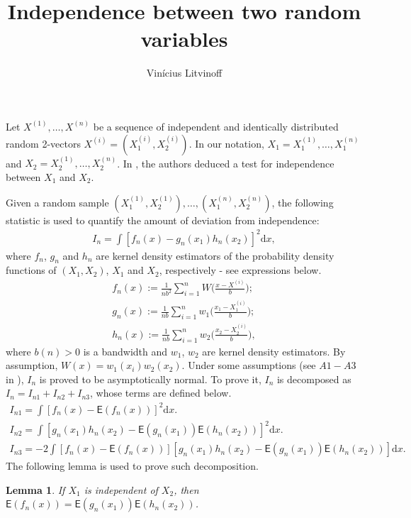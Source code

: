 \documentclass{article}
\title{Independence between two random variables}
\author{Vinícius Litvinoff}
\newtheorem{lemma}{Lemma}[section]
\begin{document}
\maketitle

Let $X^{(1)}, \dots, X^{(n)}$ be a sequence of independent and identically distributed random 2-vectors $X^{(i)} = (X_1^{(i)}, X_2^{(i)})$. In our notation, $X_1 = X_1^{(1)}, \dots, X_1^{(n)}$ and $X_2 = X_2^{(1)}, \dots, X_2^{(n)}$. In \cite{rosenblatt1992nonparametric}, the authors deduced a test for independence between $X_1$ and $X_2$.

Given a random sample $(X_1^{(1)},X_2^{(1)}), \dots, (X_1^{(n)},X_2^{(n)})$, the following statistic is used to quantify the amount of deviation from independence:
\begin{align}
    I_n = \int [f_n(x) - g_n(x_1) h_n(x_2)]^2 \mathrm{d} x,
\end{align}
where $f_n$, $g_n$ and $h_n$ are kernel density estimators of the probability density functions of $(X_1,X_2)$, $X_1$ and $X_2$, respectively - see expressions below. 
\begin{align}
    f_n(x) := \frac{1}{nb^2} \sum_{i=1}^{n} W \Bigg( \frac{x - X^{(i)}}{b} \Bigg); \\
     g_n(x) := \frac{1}{nb} \sum_{i=1}^{n} w_1 \Bigg( \frac{x_1 - X_1^{(i)}}{b} \Bigg); \\
      h_n(x) := \frac{1}{nb} \sum_{i=1}^{n} w_2 \Bigg( \frac{x_2 - X_2^{(i)}}{b} \Bigg),
\end{align}
where $b(n) > 0$ is a bandwidth and $w_1$, $w_2$ are kernel density estimators. By assumption, $W(x) = w_1(x_i) w_2(x_2)$.
Under some assumptions (see $A1-A3$ in \cite{rosenblatt1992nonparametric}), $I_n$ is proved to be asymptotically normal. To prove it, $I_n$ is decomposed as $I_n = I_{n1} + I_{n2} + I_{n3}$, whose terms are defined below.
\begin{align}
    I_{n1} = \int [f_n(x) - \mathsf{E} (f_n(x))]^2 \mathrm{d} x. \\
    I_{n2} = \int [g_n(x_1) h_n(x_2) - \mathsf{E} (g_n(x_1)) \mathsf{E} (h_n(x_2))]^2 \mathrm{d} x. \\
    I_{n3} = -2 \int [f_n(x) - \mathsf{E} (f_n(x))] [g_n(x_1) h_n(x_2) - \mathsf{E} (g_n(x_1)) \mathsf{E} (h_n(x_2))] \mathrm{d} x.
\end{align}
The following lemma is used to prove such decomposition.
\begin{lemma}
    If $X_1$ is independent of $X_2$, then $\mathsf{E} (f_n(x)) = \mathsf{E} (g_n(x_1)) \mathsf{E} (h_n(x_2))$.
\end{lemma}
\end{document}
